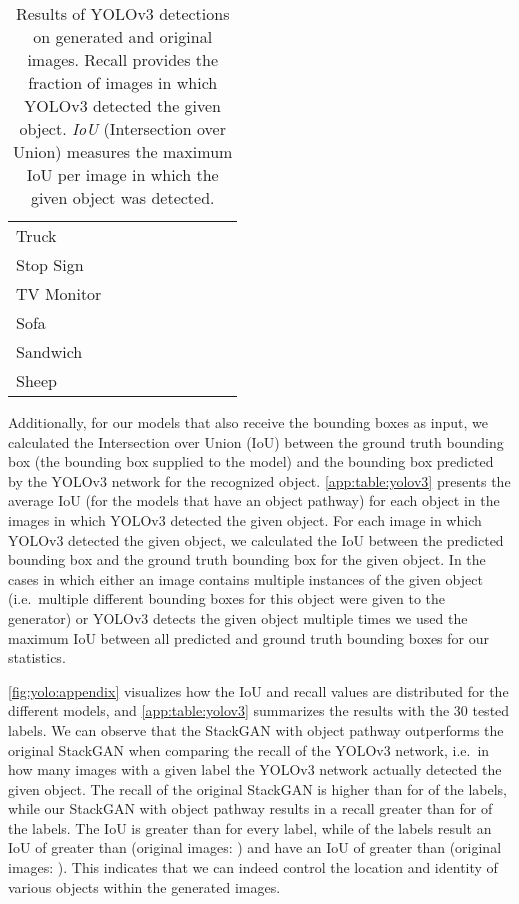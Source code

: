 \documentclass{article} \usepackage{iclr2019_conference,times}
\begin{document}
\begin{table}[t]
\begin{tabular}{@{}l | c | c | c | c | c | c | c | c@{}}
Truck &  &  &  &  &  &  &  &  \\
Stop Sign &  &  &  &  &  &  &  &  \\
TV Monitor &  &  &  &  &  &  &  &  \\
Sofa &  &  &  &  &  &  &  &  \\
Sandwich &  &  &  &  &  &  &  &  \\
Sheep &  &  &  &  &  &  &  &  \\
\bottomrule
\end{tabular}
\caption{Results of YOLOv3 detections on generated and original images. Recall provides the fraction of images in which YOLOv3 detected the given object. \emph{IoU} (Intersection over Union) measures the maximum IoU per image in which the given object was detected.}
\label{app:table:yolov3}
\end{table}

	Additionally, for our models that also receive the bounding boxes as input, we calculated the Intersection over Union (IoU) between the ground truth bounding box (the bounding box supplied to the model) and the bounding box predicted by the YOLOv3 network for the recognized object.
	\autoref{app:table:yolov3} presents the average IoU (for the models that have an object pathway) for each object in the images in which YOLOv3 detected the given object.
	For each image in which YOLOv3 detected the given object, we calculated the IoU between the predicted bounding box and the ground truth bounding box for the given object.
	In the cases in which either an image contains multiple instances of the given object (i.e.\ multiple different bounding boxes for this object were given to the generator) or YOLOv3 detects the given object multiple times we used the maximum IoU between all predicted and ground truth bounding boxes for our statistics.
	
	\autoref{fig:yolo:appendix} visualizes how the IoU and recall values are distributed for the different models, and \autoref{app:table:yolov3} summarizes the results with the 30 tested labels.
	We can observe that the StackGAN with object pathway outperforms the original StackGAN when comparing the recall of the YOLOv3 network, i.e.\ in how many images with a given label the YOLOv3 network actually detected the given object.
	The recall of the original StackGAN is higher than  for  of the labels, while our StackGAN with object pathway results in a recall greater than  for  of the labels.
	The IoU is greater than  for every label, while  of the labels result an IoU of greater than  (original images: ) and  have an IoU of greater than  (original images: ).
	This indicates that we can indeed control the location and identity of various objects within the generated images.
	
\end{document}
